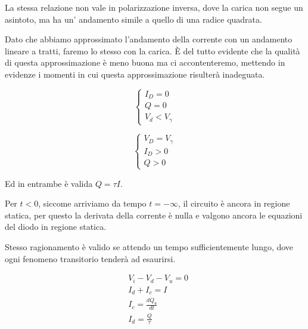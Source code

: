 \documentclass[../elettronica]{subfiles}
\begin{document}
La stessa relazione non vale in polarizzazione inversa, dove la carica non segue un asintoto, ma ha un' andamento
simile a quello di una radice quadrata.

Dato che abbiamo approssimato l'andamento della corrente con un andamento lineare a tratti, faremo lo stesso con la carica.
È del tutto evidente che la qualità di questa approssimazione è meno buona ma ci accontenteremo, mettendo in evidenze i momenti
in cui questa approssimazione risulterà inadeguata.


\begin{minipage}{.45\textwidth}
    \begin{tcolorbox}[title=Diodo OFF]
        \[\begin{cases}
            I_D = 0\\
            Q = 0\\
            V_d < V_\gamma
        \end{cases}\]
    \end{tcolorbox}
\end{minipage}
\begin{minipage}{.45\textwidth}
    \begin{tcolorbox}[title=Diodo ON]
        \[\begin{cases}
            V_D = V_\gamma\\
            I_D > 0\\
            Q > 0
        \end{cases}\]
    \end{tcolorbox}
\end{minipage}

Ed in entrambe è valida $Q = \tau I$.

\noindent Per $t < 0$, siccome arriviamo da tempo $t = -\infty$, il circuito è ancora in regione statica,
per questo la derivata della corrente è nulla e valgono ancora le equazioni del diodo in regione statica.

Stesso ragionamento è valido se attendo un tempo sufficientemente lungo, dove ogni fenomeno
transitorio tenderà ad esaurirsi.

\begin{tcolorbox}[title=Equazioni generali]
    \begin{align*}
        &V_i - V_d - V_u = 0\\
        &I_d + I_c = I\\
        &I_c = \frac{dQ_u}{dt}\\
        &I_d = \frac{Q}{\tau}
    \end{align*}
\end{tcolorbox}
\end{document}
